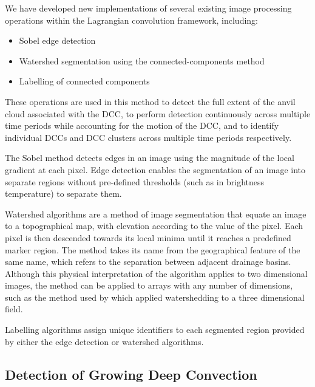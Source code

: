 \documentclass[amt, manuscript]{copernicus}
\begin{document}
We have developed new implementations of several existing image processing operations within the Lagrangian convolution framework, including:
\begin{itemize}
    \item Sobel edge detection \citep{sobel_isotropic_2014}
    \item Watershed segmentation using the connected-components method \citep{bieniek_efficient_2000}
    \item Labelling of connected components \citep{hoshen_percolation_1976}
\end{itemize}

These operations are used in this method to detect the full extent of the anvil cloud associated with the DCC, to perform detection continuously across multiple time periods while accounting for the motion of the DCC, and to identify individual DCCs and DCC clusters across multiple time periods respectively.

The Sobel method detects edges in an image using the magnitude of the local gradient at each pixel.
Edge detection enables the segmentation of an image into separate regions without pre-defined thresholds (such as in brightness temperature) to separate them.

Watershed algorithms are a method of image segmentation that equate an image to a topographical map, with elevation according to the value of the pixel.
Each pixel is then descended towards its local minima until it reaches a predefined marker region.
The method takes its name from the geographical feature of the same name, which refers to the separation between adjacent drainage basins.
Although this physical interpretation of the algorithm applies to two dimensional images, the method can be applied to arrays with any number of dimensions, such as the method used by \citet{fiolleau_algorithm_2013} which applied watershedding to a three dimensional field.

Labelling algorithms assign unique identifiers to each segmented region provided by either the edge detection or watershed algorithms.

\subsection{Detection of Growing Deep Convection}
\end{document}

